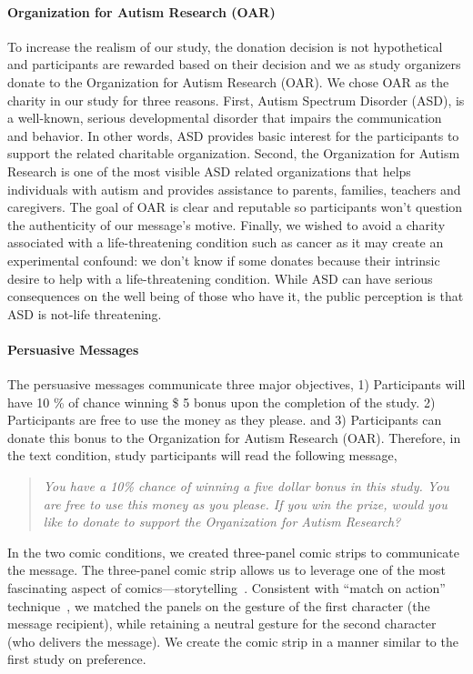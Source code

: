 \paragraph{Organization for Autism Research (OAR)}
To increase the realism of our study, the donation decision is not hypothetical and participants are rewarded based on their decision and we as study organizers donate to the Organization for Autism Research (OAR). We chose OAR as the charity in our study for three reasons. First, Autism Spectrum Disorder (ASD), is a well-known, serious developmental disorder that impairs the communication and behavior. In other words, ASD provides basic interest for the participants to support the related charitable organization. Second, the Organization for Autism Research is one of the most visible ASD related organizations that helps individuals with autism and provides assistance to parents, families, teachers and caregivers. The goal of OAR is clear and reputable so participants won't question the authenticity of our message's motive. Finally, we wished to avoid a charity associated with a life-threatening condition such as cancer as it may create an experimental confound: we don't know if some donates because their intrinsic desire to help with a life-threatening condition. While ASD can have serious consequences on the well being of those who have it, the public perception is that ASD is not-life threatening. 

\paragraph{Persuasive Messages}

The persuasive messages communicate three major objectives, 1) Participants will have 10 \% of chance winning \$ 5 bonus upon the completion of the study. 2) Participants are free to use the money as they please. and 3) Participants can donate this bonus to the Organization for Autism Research (OAR). Therefore, in the text condition, study participants will read the following message,
\begin{quote}
  \textit{You have a 10\% chance of winning a five dollar bonus in this study. You are free to use this money as you please. If you win the prize, would you like to donate to support the Organization for Autism Research?}
\end{quote}
In the two comic conditions, we created three-panel comic strips to communicate the message. The three-panel comic strip allows us to leverage one of the most fascinating aspect of comics---storytelling~\cite{scott1993understanding}. 
Consistent with ``match on action'' technique~\cite{scott1993understanding}, we matched the panels on the gesture of the first character (the message recipient), while retaining a neutral gesture for the second character (who delivers the message). We create the comic strip in a manner similar to the first study on preference.

